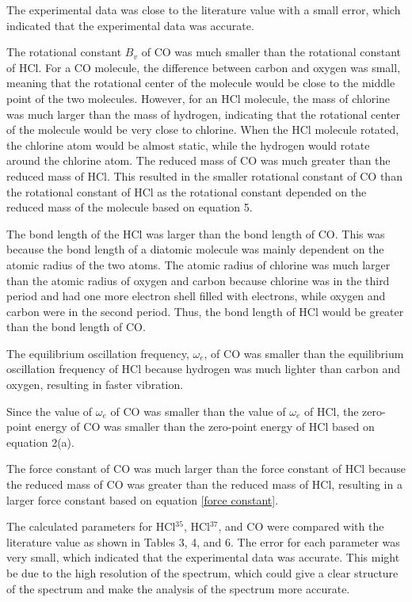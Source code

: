 \documentclass[twocolumn]{article} %
\begin{document}
The experimental data was close to the literature value with a small error, which indicated that the experimental data was accurate. 

The rotational constant $B_v$ of CO was much smaller than the rotational constant of HCl. For a CO molecule, the difference between carbon and oxygen was small, meaning that the rotational center of the molecule would be close to the middle point of the two molecules. However, for an HCl molecule, the mass of chlorine was much larger than the mass of hydrogen, indicating that the rotational center of the molecule would be very close to chlorine. When the HCl molecule rotated, the chlorine atom would be almost static, while the hydrogen would rotate around the chlorine atom. 
The reduced mass of CO was much greater than the reduced mass of HCl. This resulted in the smaller rotational constant of CO than the rotational constant of HCl as the rotational constant depended on the reduced mass of the molecule based on equation 5. 



The bond length of the HCl was larger than the bond length of CO. This was because the bond length of a diatomic molecule was mainly dependent on the atomic radius of the two atoms. The atomic radius of chlorine was much larger than the atomic radius of oxygen and carbon because chlorine was in the third period and had one more electron shell filled with electrons, while oxygen and carbon were in the second period. Thus, the bond length of HCl would be greater than the bond length of CO.

The equilibrium oscillation frequency, $\omega_e$, of CO was smaller than the equilibrium oscillation frequency of HCl because hydrogen was much lighter than carbon and oxygen, resulting in faster vibration.

Since the value of $\omega_e$ of CO was smaller than the value of $\omega_e$ of HCl, the zero-point energy of CO was smaller than the zero-point energy of HCl based on equation 2(a).

The force constant of CO was much larger than the force constant of HCl because the reduced mass of CO was greater than the reduced mass of HCl, resulting in a larger force constant based on equation \ref{force constant}.

The calculated parameters for HCl$^{35}$, HCl$^{37}$, and CO were compared with the literature value as shown in Tables 3, 4, and 6. The error for each parameter was very small, which indicated that the experimental data was accurate. This might be due to the high resolution of the spectrum, which could give a clear structure of the spectrum and make the analysis of the spectrum more accurate.
\end{document}
